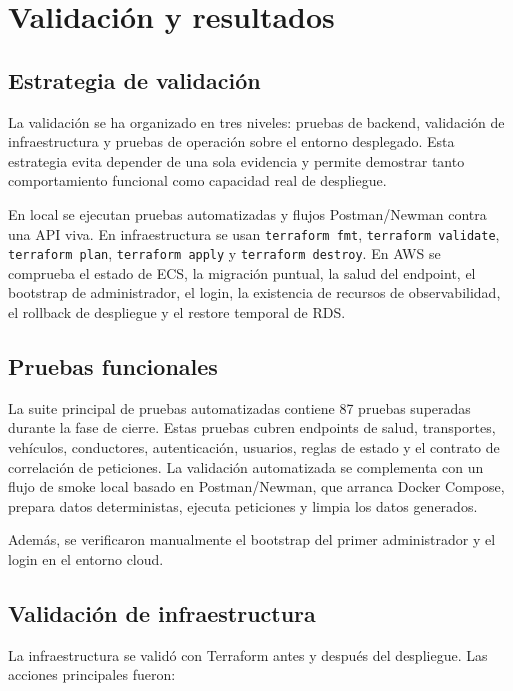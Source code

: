 \chapter{Validación y resultados}
\label{chap:validacion-resultados}

\section{Estrategia de validación}
\label{sec:estrategia-validacion}

La validación se ha organizado en tres niveles: pruebas de backend, validación de infraestructura y pruebas de operación sobre el entorno desplegado. Esta estrategia evita depender de una sola evidencia y permite demostrar tanto comportamiento funcional como capacidad real de despliegue.

En local se ejecutan pruebas automatizadas y flujos Postman/Newman contra una API viva. En infraestructura se usan \texttt{terraform fmt}, \texttt{terraform validate}, \texttt{terraform plan}, \texttt{terraform apply} y \texttt{terraform destroy}. En AWS se comprueba el estado de ECS, la migración puntual, la salud del endpoint, el bootstrap de administrador, el login, la existencia de recursos de observabilidad, el rollback de despliegue y el restore temporal de RDS.

\section{Pruebas funcionales}
\label{sec:pruebas-funcionales}

La suite principal de pruebas automatizadas contiene 87 pruebas superadas durante la fase de cierre. Estas pruebas cubren endpoints de salud, transportes, vehículos, conductores, autenticación, usuarios, reglas de estado y el contrato de correlación de peticiones. La validación automatizada se complementa con un flujo de smoke local basado en Postman/Newman, que arranca Docker Compose, prepara datos deterministas, ejecuta peticiones y limpia los datos generados.

Además, se verificaron manualmente el bootstrap del primer administrador y el login en el entorno cloud.

\section{Validación de infraestructura}
\label{sec:validacion-infraestructura}

La infraestructura se validó con Terraform antes y después del despliegue. Las acciones principales fueron:

